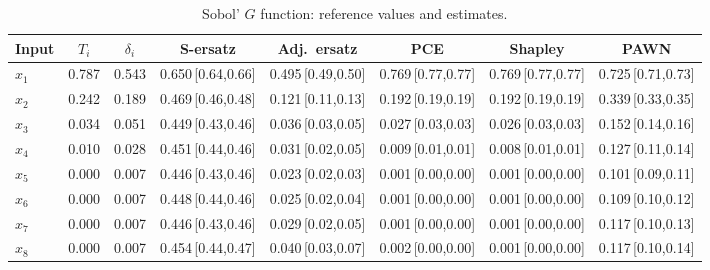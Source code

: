 \documentclass[11pt,a4paper]{article}
\begin{document}
\begin{table}[H]\centering\footnotesize
\begin{tabular}{@{}lccccccc@{}}\toprule
Input & $T_i$ & $\delta_i$ & S-ersatz & Adj.\ ersatz & PCE & Shapley & PAWN \\ \midrule
$x_{1}$ & 0.787 & 0.543 & 0.650\,{\scriptsize[0.64,0.66]} & 0.495\,{\scriptsize[0.49,0.50]} & 0.769\,{\scriptsize[0.77,0.77]} & 0.769\,{\scriptsize[0.77,0.77]} & 0.725\,{\scriptsize[0.71,0.73]} \\
$x_{2}$ & 0.242 & 0.189 & 0.469\,{\scriptsize[0.46,0.48]} & 0.121\,{\scriptsize[0.11,0.13]} & 0.192\,{\scriptsize[0.19,0.19]} & 0.192\,{\scriptsize[0.19,0.19]} & 0.339\,{\scriptsize[0.33,0.35]} \\
$x_{3}$ & 0.034 & 0.051 & 0.449\,{\scriptsize[0.43,0.46]} & 0.036\,{\scriptsize[0.03,0.05]} & 0.027\,{\scriptsize[0.03,0.03]} & 0.026\,{\scriptsize[0.03,0.03]} & 0.152\,{\scriptsize[0.14,0.16]} \\
$x_{4}$ & 0.010 & 0.028 & 0.451\,{\scriptsize[0.44,0.46]} & 0.031\,{\scriptsize[0.02,0.05]} & 0.009\,{\scriptsize[0.01,0.01]} & 0.008\,{\scriptsize[0.01,0.01]} & 0.127\,{\scriptsize[0.11,0.14]} \\
$x_{5}$ & 0.000 & 0.007 & 0.446\,{\scriptsize[0.43,0.46]} & 0.023\,{\scriptsize[0.02,0.03]} & 0.001\,{\scriptsize[0.00,0.00]} & 0.001\,{\scriptsize[0.00,0.00]} & 0.101\,{\scriptsize[0.09,0.11]} \\
$x_{6}$ & 0.000 & 0.007 & 0.448\,{\scriptsize[0.44,0.46]} & 0.025\,{\scriptsize[0.02,0.04]} & 0.001\,{\scriptsize[0.00,0.00]} & 0.001\,{\scriptsize[0.00,0.00]} & 0.109\,{\scriptsize[0.10,0.12]} \\
$x_{7}$ & 0.000 & 0.007 & 0.446\,{\scriptsize[0.43,0.46]} & 0.029\,{\scriptsize[0.02,0.05]} & 0.001\,{\scriptsize[0.00,0.00]} & 0.001\,{\scriptsize[0.00,0.00]} & 0.117\,{\scriptsize[0.10,0.13]} \\
$x_{8}$ & 0.000 & 0.007 & 0.454\,{\scriptsize[0.44,0.47]} & 0.040\,{\scriptsize[0.03,0.07]} & 0.002\,{\scriptsize[0.00,0.00]} & 0.001\,{\scriptsize[0.00,0.00]} & 0.117\,{\scriptsize[0.10,0.14]} \\
\bottomrule\end{tabular}
\caption{Sobol' $G$ function: reference values and estimates.}
\label{tab:in5}
\end{table}
\end{document}
